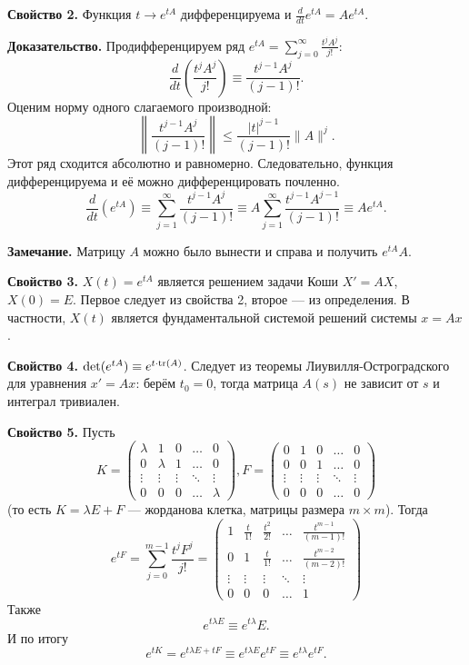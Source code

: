 \textbf{Свойство 2.} Функция $t \to e^{tA}$ дифференцируема и $\frac{d}{dt} e^{tA} = A e^{tA}$.

\textbf{Доказательство.}
Продифференцируем ряд $e^{tA} = \sum_{j=0}^{\infty} \frac{t^j A^j}{j!}$:
\[
    \frac{d}{dt} \left( \frac{t^j A^j}{j!} \right) \equiv \frac{t^{j-1} A^j}{(j-1)!}.
\]
Оценим норму одного слагаемого производной:
\[
    \left\| \frac{t^{j-1} A^j}{(j - 1)!} \right\| \le \frac{|t|^{j-1}}{(j-1)!} \|A\|^j.
\]
Этот ряд сходится абсолютно и равномерно.
Следовательно, функция дифференцируема и её можно дифференцировать почленно.
\[
    \frac{d}{dt} \left( e^{tA} \right) \equiv \sum_{j=1}^{\infty} \frac{t^{j-1} A^j}{(j-1)!} \equiv A \sum_{j=1}^{\infty} \frac{t^{j-1} A^{j-1}}{(j-1)!} \equiv A e^{tA}.
\]

\QED

\textbf{Замечание.} Матрицу $A$ можно было вынести и справа и получить $e^{tA} A$.

\textbf{Свойство 3.} $X(t) = e^{tA}$ является решением задачи Коши $X' = AX$, $X(0) = E$.
Первое следует из свойства 2, второе --- из определения.
В частности, $X(t)$ является фундаментальной системой решений системы $x
 = Ax$.

\textbf{Свойство 4.} $\det(e^{tA}) \equiv e^{t \cdot \operatorname{tr}(A)}$.
Следует из теоремы Лиувилля-Остроградского для уравнения $x' = Ax$: берём $t_0 = 0$, тогда матрица $A(s)$ не зависит от $s$ и интеграл тривиален.

\textbf{Свойство 5.} Пусть
\[
    K = 
    \begin{pmatrix}
        \lambda & 1 & 0 & \dots & 0 \\
        0 & \lambda & 1 & \dots & 0 \\
        \vdots & \vdots & \vdots & \ddots & \vdots \\
        0 & 0 & 0 & \dots & \lambda
    \end{pmatrix},
    F = 
    \begin{pmatrix}
        0 & 1 & 0 & \dots & 0 \\
        0 & 0 & 1 & \dots & 0 \\
        \vdots & \vdots & \vdots & \ddots & \vdots \\
        0 & 0 & 0 & \dots & 0
    \end{pmatrix}
\]
(то есть $K = \lambda E + F$ --- жорданова клетка, матрицы размера $m \times m$).
Тогда
\[
    e^{tF} = \sum_{j=0}^{m-1} \frac{t^j F^j}{j!} =
    \begin{pmatrix}
        1 & \frac{t}{1!} & \frac{t^2}{2!} & \dots & \frac{t^{m-1}}{(m-1)!} \\
        0 & 1 & \frac{t}{1!} & \dots & \frac{t^{m-2}}{(m-2)!} \\
        \vdots & \vdots & \vdots & \ddots & \vdots \\
        0 & 0 & 0 & \dots & 1
    \end{pmatrix}
\]
Также
\[
    e^{t \lambda E} \equiv e^{t \lambda} E.
\]
И по итогу
\[
    e^{tK} = e^{t \lambda E + tF} \equiv e^{t \lambda E} e^{tF} \equiv e^{t\lambda} e^{tF}.
\]

